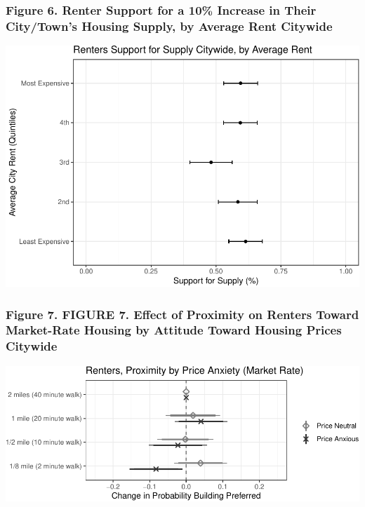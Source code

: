 \documentclass[]{article}
\begin{document}
\hypertarget{figure-6.-renter-support-for-a-10-increase-in-their-citytowns-housing-supply-by-average-rent-citywide}{%
\subsubsection{Figure 6. Renter Support for a 10\% Increase in Their City/Town's Housing Supply, by Average Rent Citywide}\label{figure-6.-renter-support-for-a-10-increase-in-their-citytowns-housing-supply-by-average-rent-citywide}}

\includegraphics{Zheng-Ruth-Renters-Paper_files/figure-latex/Print Figure 6-1.pdf}

\hypertarget{figure-7.-figure-7.-effect-of-proximity-on-renters-toward-market-rate-housing-by-attitude-toward-housing-prices-citywide}{%
\subsubsection{Figure 7. FIGURE 7. Effect of Proximity on Renters Toward Market-Rate Housing by Attitude Toward Housing Prices Citywide}\label{figure-7.-figure-7.-effect-of-proximity-on-renters-toward-market-rate-housing-by-attitude-toward-housing-prices-citywide}}

\includegraphics{Zheng-Ruth-Renters-Paper_files/figure-latex/Figure 7 print-1.pdf}
\end{document}
